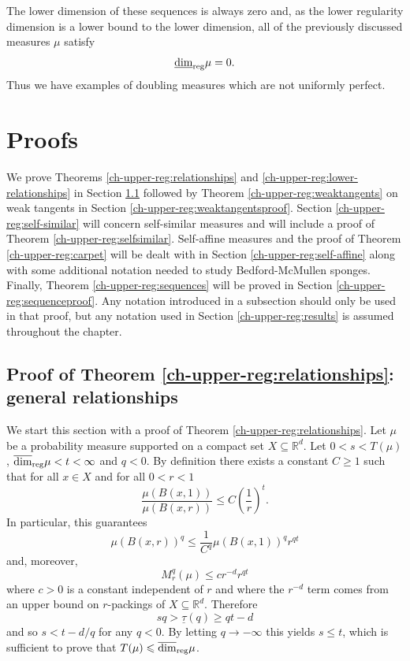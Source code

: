 \newpage 
The lower dimension of these sequences is always zero and, as the lower regularity dimension is a lower bound to the lower dimension, all of the previously discussed measures $\mu$ satisfy 
\[
\underline{\dim}_{\textup{reg}} \mu = 0.
\]
Thus we have examples of doubling measures which are not uniformly perfect. 



\section{Proofs} \label{ch-upper-reg:proof}

We prove Theorems \ref{ch-upper-reg:relationships} and \ref{ch-upper-reg:lower-relationships} in Section \ref{ch-upper-reg:spectrumproof} followed by Theorem \ref{ch-upper-reg:weaktangents} on weak tangents in Section \ref{ch-upper-reg:weaktangentsproof}. Section \ref{ch-upper-reg:self-similar} will concern self-similar measures and will include a proof of Theorem \ref{ch-upper-reg:selfsimilar}. Self-affine measures and the proof of Theorem \ref{ch-upper-reg:carpet} will be dealt with in Section \ref{ch-upper-reg:self-affine} along with some additional notation needed to study Bedford-McMullen sponges. Finally, Theorem \ref{ch-upper-reg:sequences} will be proved in Section \ref{ch-upper-reg:sequenceproof}. Any notation introduced in a subsection should only be used in that proof, but any notation used in Section \ref{ch-upper-reg:results} is assumed throughout the chapter.




\subsection{Proof of Theorem \ref{ch-upper-reg:relationships}: general relationships}\label{ch-upper-reg:spectrumproof}

We start this section with a proof of Theorem \ref{ch-upper-reg:relationships}. Let $\mu$ be a probability measure supported on a compact set $X \subseteq \mathbb{R}^d$. Let $0<s< T(\mu)$,  $\overline{\dim}_{\textup{reg}} \mu < t < \infty$ and $q<0$. By definition there exists a  constant  $C \geq 1$ such that for all $x\in X$ and for all $0<r< 1$
\[
\frac{\mu(B(x,1))}{\mu(B(x,r))} \le C \left(\frac{1}{r} \right)^t.
\]
In particular, this guarantees 
\[
\mu(B(x,r))^q \le \frac{1}{C^q}\mu(B(x,1))^q  r^{qt}
\]
and, moreover, 
\[
M_r^q(\mu) \leq c r^{-d}r^{qt}
\]
where $c>0$ is a constant independent of  $r$ and where the $r^{-d}$ term comes from an upper bound on $r$-packings of $X \subseteq \mathbb{R}^d$.  Therefore 
\[
sq > \underline{\tau}(q)   \ge  qt-d
\]
and so $s<t-d/q$ for any $q<0$. By letting $q \rightarrow - \infty$ this yields $s \le t$, which is sufficient to prove that $T(\mu) \leqslant \overline{\dim}_{\textup{reg}} \mu$.

